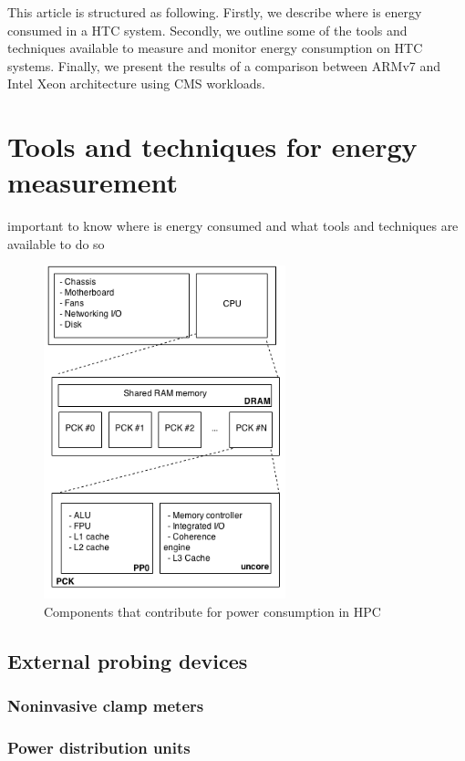 \documentclass[a4paper]{jpconf}
\begin{document}
This article is structured as following. Firstly, we describe where is energy consumed in a HTC system. Secondly, we outline some of the tools and techniques available to measure and monitor energy consumption on HTC systems. Finally, we present the results of a comparison between ARMv7 and Intel Xeon architecture using CMS workloads.


\section{Tools and techniques for energy measurement}

important to know where is energy consumed and what tools and techniques are available to do so

\begin{figure}[ht!]
\centering
\includegraphics[width=70mm]{img/energy_model.png}
\caption{Components that contribute for power consumption in HPC}
\label{overflow}
\end{figure}

\subsection{External probing devices}

\subsubsection{Noninvasive clamp meters}
\subsubsection{Power distribution units}
\end{document}
